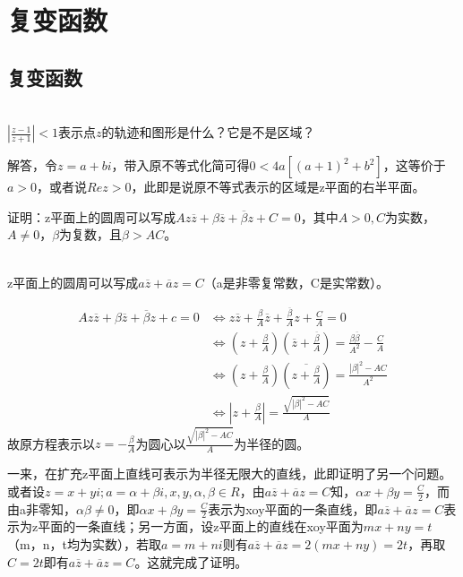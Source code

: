 \chapter{复变函数}

\section{复变函数}
\begin{exercise}
\hfill\\
$\displaystyle|\frac{z-1}{z+1}|<1$表示点$z$的轨迹和图形是什么？它是不是区域？

解答，令$z=a+bi$，带入原不等式化简可得$0<4a[(a+1)^2+b^2]$，这等价于$a>0$，或者说$Rez>0$，此即是说原不等式表示的区域是z平面的右半平面。

证明：z平面上的圆周可以写成$Az\overline{z}+\beta\overline{z}+\overline{\beta}z+C=0$，其中$A>0,C$为实数，$A\neq0$，$\beta$为复数，且$\beta>AC$。
\end{exercise}
\begin{exercise}
\hfill\\
z平面上的圆周可以写成$a\overline{z}+\overline{a}z=C$（a是非零复常数，C是实常数）。

\[
\begin{aligned}
Az\overline{z}+\beta\overline{z}+\overline{\beta}z+c=0&\iff z\overline{z}+\frac{\beta}A\overline{z}+\frac{\overline{\beta}}Az+\frac CA=0\\
&\iff(z+\frac{\beta}A)(\overline{z}+\frac{\overline{\beta}}A)=\frac{\beta\overline{\beta}}{A^2}-\frac CA\\
&\iff(z+\frac{\beta}A)(\overline{z+\frac{\beta}A})=\frac{|\beta|^2-AC}{A^2}\\
&\iff|z+\frac{\beta}A|=\frac{\sqrt{|\beta|^2-AC}}A
\end{aligned}
\]
故原方程表示以$z=-\frac{\beta}A$为圆心以$\frac{\sqrt{|\beta|^2-AC}}A$为半径的圆。

一来，在扩充z平面上直线可表示为半径无限大的直线，此即证明了另一个问题。或者设$z=x+yi;a=\alpha+\beta i,x,y,\alpha,\beta\in R$，由$a\overline{z}+\overline{a}z=C$知，$\alpha x+\beta y=\frac C2$，而由a非零知，$\alpha\beta\neq0$，即$\alpha x+\beta y=\frac C2$表示为xoy平面的一条直线，即$a\overline{z}+\overline{a}z=C$表示为z平面的一条直线；另一方面，设z平面上的直线在xoy平面为$mx+ny=t$（m，n，t均为实数），若取$a=m+ni$则有$a\overline{z}+\overline{a}z=2(mx+ny)=2t$，再取$C=2t$即有$a\overline{z}+\overline{a}z=C$。这就完成了证明。


\end{exercise}







